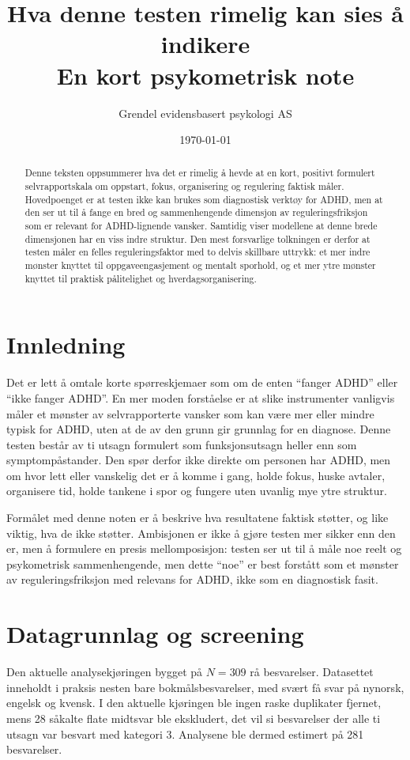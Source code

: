 \documentclass[11pt,a4paper]{article}
\title{Hva denne testen rimelig kan sies å indikere\\
\large En kort psykometrisk note}
\author{Grendel evidensbasert psykologi AS}
\date{\today}
\begin{document}
\maketitle

\begin{abstract}
Denne teksten oppsummerer hva det er rimelig å hevde at en kort, positivt formulert selvrapportskala om oppstart, fokus, organisering og regulering faktisk måler. Hovedpoenget er at testen ikke kan brukes som diagnostisk verktøy for ADHD, men at den ser ut til å fange en bred og sammenhengende dimensjon av reguleringsfriksjon som er relevant for ADHD-lignende vansker. Samtidig viser modellene at denne brede dimensjonen har en viss indre struktur. Den mest forsvarlige tolkningen er derfor at testen måler en felles reguleringsfaktor med to delvis skillbare uttrykk: et mer indre mønster knyttet til oppgaveengasjement og mentalt sporhold, og et mer ytre mønster knyttet til praktisk pålitelighet og hverdagsorganisering.
\end{abstract}

\section{Innledning}
Det er lett å omtale korte spørreskjemaer som om de enten ``fanger ADHD'' eller ``ikke fanger ADHD''. En mer moden forståelse er at slike instrumenter vanligvis måler et mønster av selvrapporterte vansker som kan være mer eller mindre typisk for ADHD, uten at de av den grunn gir grunnlag for en diagnose. Denne testen består av ti utsagn formulert som funksjonsutsagn heller enn som symptompåstander. Den spør derfor ikke direkte om personen har ADHD, men om hvor lett eller vanskelig det er å komme i gang, holde fokus, huske avtaler, organisere tid, holde tankene i spor og fungere uten uvanlig mye ytre struktur.

Formålet med denne noten er å beskrive hva resultatene faktisk støtter, og like viktig, hva de ikke støtter. Ambisjonen er ikke å gjøre testen mer sikker enn den er, men å formulere en presis mellomposisjon: testen ser ut til å måle noe reelt og psykometrisk sammenhengende, men dette ``noe'' er best forstått som et mønster av reguleringsfriksjon med relevans for ADHD, ikke som en diagnostisk fasit.

\section{Datagrunnlag og screening}
Den aktuelle analysekjøringen bygget på $N = 309$ rå besvarelser. Datasettet inneholdt i praksis nesten bare bokmålsbesvarelser, med svært få svar på nynorsk, engelsk og kvensk. I den aktuelle kjøringen ble ingen raske duplikater fjernet, mens 28 såkalte flate midtsvar ble ekskludert, det vil si besvarelser der alle ti utsagn var besvart med kategori 3. Analysene ble dermed estimert på 281 besvarelser.
\end{document}
